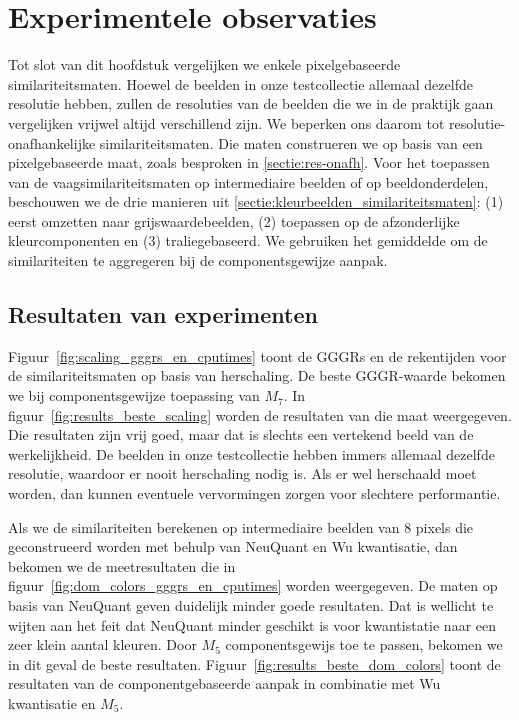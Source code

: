 \section{Experimentele observaties}

Tot slot van dit hoofdstuk vergelijken we enkele pixelgebaseerde similariteitsmaten.
Hoewel de beelden in onze testcollectie allemaal dezelfde resolutie hebben, zullen de
resoluties van de beelden die we in de praktijk gaan vergelijken vrijwel altijd verschillend zijn.
We beperken ons daarom tot resolutie-onafhankelijke similariteitsmaten. Die maten construeren
we op basis van een pixelgebaseerde maat, zoals besproken in \ref{sectie:res-onafh}. 
Voor het toepassen van de vaagsimilariteitsmaten op
intermediaire beelden of op beeldonderdelen, beschouwen we de drie manieren uit \ref{sectie:kleurbeelden_similariteitsmaten}:
(1) eerst omzetten naar grijswaardebeelden, 
(2) toepassen op de afzonderlijke kleurcomponenten en 
(3) traliegebaseerd. We gebruiken het gemiddelde om de similariteiten te aggregeren
bij de componentsgewijze aanpak.

\subsection{Resultaten van experimenten}

Figuur~\ref{fig:scaling_gggrs_en_cputimes} toont de GGGRs en de rekentijden voor de 
similariteitsmaten op basis van herschaling. De beste GGGR-waarde bekomen we 
bij componentsgewijze toepassing van $M_7$. In figuur~\ref{fig:results_beste_scaling} worden de resultaten van die maat
weergegeven. Die resultaten zijn vrij goed, maar dat is slechts een vertekend beeld van de
werkelijkheid. De beelden in onze testcollectie hebben immers allemaal dezelfde resolutie,
waardoor er nooit herschaling nodig is. Als er wel herschaald moet worden, dan kunnen
eventuele vervormingen zorgen voor slechtere performantie. 

Als we de similariteiten berekenen op intermediaire beelden van 8 pixels die 
geconstrueerd worden met behulp van NeuQuant en Wu kwantisatie, dan bekomen we
de meetresultaten die in figuur~\ref{fig:dom_colors_gggrs_en_cputimes} worden weergegeven.
De maten op basis van NeuQuant geven duidelijk minder goede resultaten. Dat is wellicht te wijten
aan het feit dat NeuQuant minder geschikt is voor kwantistatie naar een zeer klein aantal 
kleuren. Door $M_5$ componentsgewijs toe te passen, bekomen we in dit geval de beste resultaten. 
Figuur~\ref{fig:results_beste_dom_colors} toont de resultaten van de componentgebaseerde aanpak
in combinatie met Wu kwantisatie en $M_5$.


